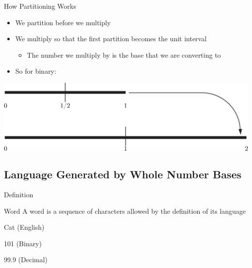 \documentclass{beamer}
\begin{document}
\begin{frame}{How Partitioning Works}
  \begin{itemize}
    \item We partition before we multiply
    \item We multiply so that the first partition becomes the unit interval
    \begin{itemize}
      \item The number we multiply by is the base that we are converting to
    \end{itemize}
    \item So for binary:
  \end{itemize}
  \includegraphics[width=\textwidth]{images/partitioning/partitioning}
\end{frame}















\subsection{Language Generated by Whole Number Bases}
\begin{frame}{Definition}
  \begin{block}{Word}
    A word is a sequence of characters allowed by the definition of its language
  \end{block}\pause

  \begin{example}
    Cat (English)\pause

    101 (Binary) \pause

    99.9 (Decimal)
  \end{example}
\end{frame}
\end{document}
